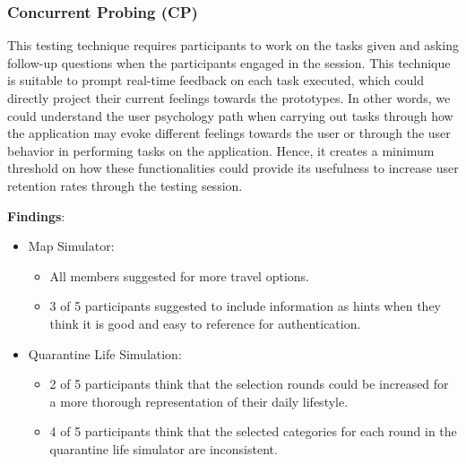     \subsubsection{Concurrent Probing (CP)}
      \par This testing technique requires participants to work on the tasks given and asking follow-up questions
      when the participants engaged in the session. This technique is suitable to prompt real-time feedback
      on each task executed, which could directly project their current feelings towards the prototypes.
      In other words, we could understand the user psychology path when carrying out tasks through how
      the application may evoke different feelings towards the user or through the user behavior in
      performing tasks on the application. Hence, it creates a minimum threshold on how these
      functionalities could provide its usefulness to increase user retention rates through the testing session.
      \par \textbf{Findings}:
        \begin{itemize}
          \item Map Simulator:
            \begin{itemize}
              \item All members suggested for more travel options. 
              \item 3 of 5 participants suggested to include information as hints when they think it is good and easy to reference for authentication.
            \end{itemize}
          \item Quarantine Life Simulation:
            \begin{itemize}
              \item 2 of 5 participants think that the selection rounds could be increased for a more thorough representation of their daily lifestyle.
              \item 4 of 5 participants think that the selected categories for each round in the quarantine life simulator are inconsistent. 
            \end{itemize}
        \end{itemize}

